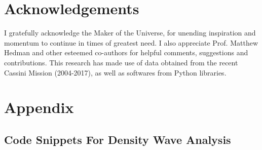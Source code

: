 \documentclass{article}
\begin{document}
\section{Acknowledgements}
I gratefully acknowledge the Maker of the Universe, for unending inspiration and momentum to continue in times of greatest need. I also appreciate Prof. Matthew Hedman and other esteemed co-authors for helpful comments, suggestions and contributions. This research has made use of data obtained from the recent Cassini Mission (2004-2017), as well as softwares from Python libraries. 


\section{Appendix}
\label{sec:appendix}


\subsection{Code Snippets For Density Wave Analysis}
\label{subsec:code}
\end{document}
